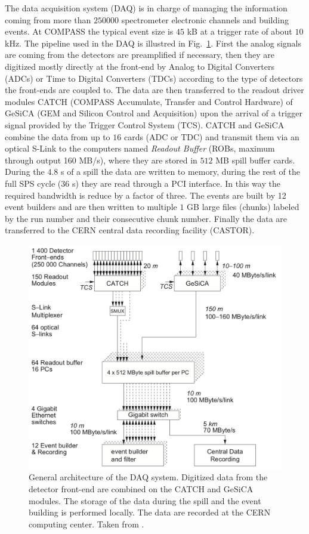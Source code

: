 The data acquisition system (DAQ) \cite{NIM} is in charge of managing the information coming from more than $250000$ spectrometer electronic channels and building events. At COMPASS the typical event size is $45$ kB at a trigger rate of about $10$ kHz. The pipeline used in the DAQ is illustred in Fig.~\ref{pic:DAQ}. First the analog signals are coming from the detectors are preamplified if necessary, then they are digitized mostly directly at the front-end by Analog to Digital Converters (ADCs) or Time to Digital Converters (TDCs) according to the type of detectors the front-ends are coupled to. The data are then transferred to the readout driver modules CATCH (COMPASS Accumulate, Transfer and Control Hardware) of GeSiCA (GEM and Silicon Control and Acquisition) upon the arrival of a trigger signal provided by the Trigger Control System (TCS). CATCH and GeSiCA combine the data from up to $16$ cards (ADC or TDC) and transmit them via an optical S-Link to the computers named \textit{Readout Buffer} (ROBs, maximum through output 160 MB/s), where they are stored in $512$ MB spill buffer cards. During the $4.8$ s of a spill the data are written to memory, during the rest of the full SPS cycle ($36$ s) they are read through a PCI interface. In this way the required bandwidth is reduce by a factor of three. The events are built by 12 event builders and are then written to multiple $1$ GB large files (chunks) labeled by the run number and their consecutive chunk number. Finally the data are transferred to the CERN central data recording facility (CASTOR).

\begin{figure}[!h]
  \centering
	\includegraphics[scale=0.4]{./gfx/DAQ.png}
	\caption{General architecture of the DAQ system. Digitized data from the detector front-end are combined on the CATCH and GeSiCA modules. The storage of the data during the spill and the event building is performed locally. The data are recorded at the CERN computing center. Taken from \cite{NIM}.}
	\label{pic:DAQ}
\end{figure}

